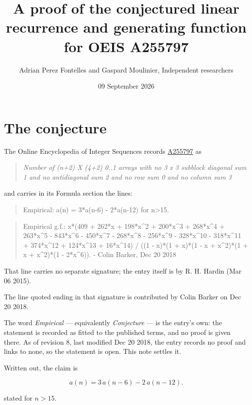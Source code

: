 \documentclass[11pt]{article}
\title{A proof of the conjectured linear recurrence and generating function for OEIS A255797}
\author{Adrian Perez Fontelles and Gaspard Moulinier, Independent researchers}
\date{09 September 2026}
\theoremstyle{definition}
\begin{document}
\maketitle
\section{The conjecture}

The Online Encyclopedia of Integer Sequences records \href{https://oeis.org/A255797}{A255797} as

\begin{quote}\itshape Number of (n+2) X (4+2) 0..1 arrays with no 3 x 3 subblock diagonal sum 1 and no antidiagonal sum 2 and no row sum 0 and no column sum 3\end{quote}

and carries in its Formula section the lines:

\begin{quote}\ttfamily Empirical: a(n) = 3*a(n-6) - 2*a(n-12) for n>15.\end{quote}

\begin{quote}\ttfamily Empirical g.f.: x*(409 + 262*x + 198*x\textasciicircum{}2 + 200*x\textasciicircum{}3 + 268*x\textasciicircum{}4 + 263*x\textasciicircum{}5 - 843*x\textasciicircum{}6 - 450*x\textasciicircum{}7 - 268*x\textasciicircum{}8 - 256*x\textasciicircum{}9 - 328*x\textasciicircum{}10 - 318*x\textasciicircum{}11 + 374*x\textasciicircum{}12 + 124*x\textasciicircum{}13 + 16*x\textasciicircum{}14) / ((1 - x)*(1 + x)*(1 - x + x\textasciicircum{}2)*(1 + x + x\textasciicircum{}2)*(1 - 2*x\textasciicircum{}6)). - Colin Barker, Dec 20 2018\end{quote}

That line carries no separate signature; the entry itself is by R. H. Hardin (Mar 06 2015).

The line quoted ending in that signature is contributed by Colin Barker on Dec 20 2018.

The word {\itshape Empirical} --- equivalently {\itshape Conjecture} --- is the entry's own: the statement is recorded as fitted to the published terms, and no proof is given there. As of revision 8, last modified Dec 20 2018, the entry records no proof and links to none, so the statement is open. This note settles it.

Written out, the claim is

\[a(n) = 3\,a(n-6) - 2\,a(n-12).\]

stated for $n > 15$.
\end{document}
